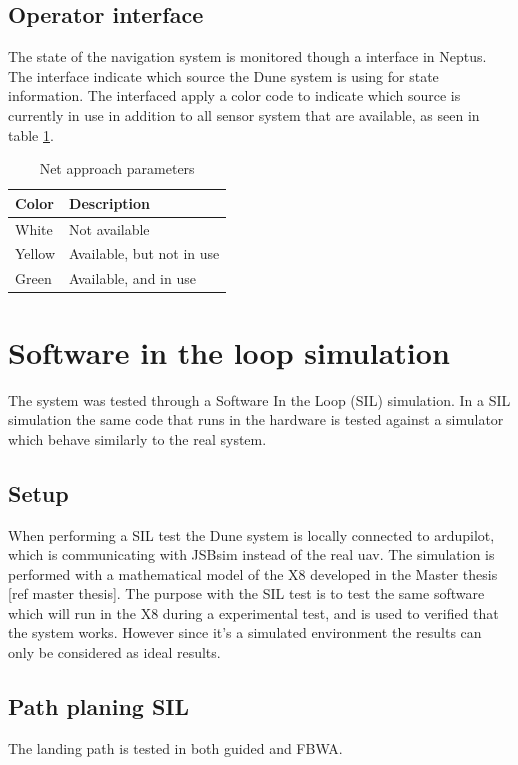 \subsection{Operator interface}
The state of the navigation system is monitored though a interface in Neptus. The interface indicate which source the Dune system is using for state information. The interfaced apply a color code to indicate which source is currently in use in addition to all sensor system that are available, as seen in table \ref{Tb:Color Code}.
\begin{table}[H]
\begin{center}
    \begin{tabular}{ | l | l |}
    \hline
    \textbf{Color} & \textbf{Description} \\ \hline
    White & Not available \\ \hline
    Yellow & Available, but not in use \\ \hline
    Green & Available, and in use \\ \hline
    \end{tabular}
\end{center}
\caption{Net approach parameters }
\label{Tb:Color Code}
\end{table}


\section{Software in the loop simulation}
The system was tested through a Software In the Loop (SIL) simulation. In a SIL simulation the same code that runs in the hardware is tested against a simulator which behave similarly to the real system.
\subsection{Setup}
When performing a SIL test the Dune system is locally connected to ardupilot, which is communicating with JSBsim instead of the real \gls{uav}. The simulation is performed with a mathematical model of the X8 developed in the Master thesis [ref master thesis]. The purpose with the SIL test is to test the same software which will run in the X8 during a experimental test, and is used to verified that the system works. However since it's a simulated environment the results can only be considered as ideal results.
\subsection{Path planing SIL}
The landing path is tested in both guided and FBWA. 
